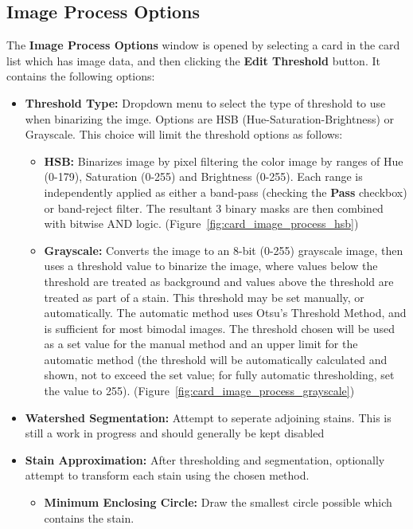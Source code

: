 \documentclass[10pt,letterpaper,titlepage]{article}
\begin{document}
    \subsection{Image Process Options}
    \label{sec:image_process}
    The \textbf{Image Process Options} window is opened by selecting a card in the card list which has image data, and then clicking the \textbf{Edit Threshold} button. It contains the following options:
    \begin{itemize}
        \item \textbf{Threshold Type:} Dropdown menu to select the type of threshold to use when binarizing the imge. Options are HSB (Hue-Saturation-Brightness) or Grayscale. This choice will limit the threshold options as follows:
        \begin{itemize}
            \item \textbf{HSB:} Binarizes image by pixel filtering the color image by ranges of Hue (0-179), Saturation (0-255) and Brightness (0-255). Each range is independently applied as either a band-pass (checking the \textbf{Pass} checkbox) or band-reject filter. The resultant 3 binary masks are then combined with bitwise AND logic. (Figure~\ref{fig:card_image_process_hsb})
            \item \textbf{Grayscale:} Converts the image to an 8-bit (0-255) grayscale image, then uses a threshold value to binarize the image, where values below the threshold are treated as background and values above the threshold are treated as part of a stain. This threshold may be set manually, or automatically. The automatic method uses Otsu's Threshold Method, and is sufficient for most bimodal images. The threshold chosen will be used as a set value for the manual method and an upper limit for the automatic method (the threshold will be automatically calculated and shown, not to exceed the set value; for fully automatic thresholding, set the value to 255). (Figure~\ref{fig:card_image_process_grayscale})
        \end{itemize}
        \item \textbf{Watershed Segmentation:} Attempt to seperate adjoining stains. \color{red} This is still a work in progress and should generally be kept disabled \color{black}
        \item \textbf{Stain Approximation:} After thresholding and segmentation, optionally attempt to transform each stain using the chosen method.
        \begin{itemize}
            \item \textbf{Minimum Enclosing Circle:} Draw the smallest circle possible which contains the stain.

\end{itemize}
\end{itemize}
\end{document}
